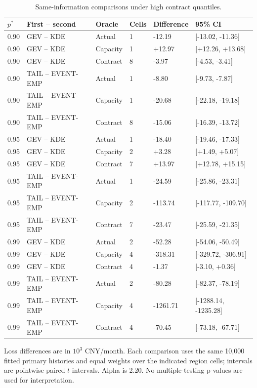 \begingroup
\fontsize{8.5}{10.5}\selectfont\setlength{\tabcolsep}{3.0pt}\renewcommand{\arraystretch}{1.23}
\begin{table}[tbp]\centering
\caption{Same-information comparisons under high contract quantiles.}\label{tab:si-high-pstar}
\begin{tabular}{@{}llllll@{}}\toprule
$p^*$ & First -- second & Oracle & Cells & Difference & 95\% CI\\\midrule
0.90 & GEV -- KDE & Actual & 1 & -12.19 & [-13.02, -11.36]\\
0.90 & GEV -- KDE & Capacity & 1 & +12.97 & [+12.26, +13.68]\\
0.90 & GEV -- KDE & Contract & 8 & -3.97 & [-4.53, -3.41]\\
0.90 & TAIL -- EVENT-EMP & Actual & 1 & -8.80 & [-9.73, -7.87]\\
0.90 & TAIL -- EVENT-EMP & Capacity & 1 & -20.68 & [-22.18, -19.18]\\
0.90 & TAIL -- EVENT-EMP & Contract & 8 & -15.06 & [-16.39, -13.72]\\
0.95 & GEV -- KDE & Actual & 1 & -18.40 & [-19.46, -17.33]\\
0.95 & GEV -- KDE & Capacity & 2 & +3.28 & [+1.49, +5.07]\\
0.95 & GEV -- KDE & Contract & 7 & +13.97 & [+12.78, +15.15]\\
0.95 & TAIL -- EVENT-EMP & Actual & 1 & -24.59 & [-25.86, -23.31]\\
0.95 & TAIL -- EVENT-EMP & Capacity & 2 & -113.74 & [-117.77, -109.70]\\
0.95 & TAIL -- EVENT-EMP & Contract & 7 & -23.47 & [-25.59, -21.35]\\
0.99 & GEV -- KDE & Actual & 2 & -52.28 & [-54.06, -50.49]\\
0.99 & GEV -- KDE & Capacity & 4 & -318.31 & [-329.72, -306.91]\\
0.99 & GEV -- KDE & Contract & 4 & -1.37 & [-3.10, +0.36]\\
0.99 & TAIL -- EVENT-EMP & Actual & 2 & -80.28 & [-82.37, -78.19]\\
0.99 & TAIL -- EVENT-EMP & Capacity & 4 & -1261.71 & [-1288.14, -1235.28]\\
0.99 & TAIL -- EVENT-EMP & Contract & 4 & -70.45 & [-73.18, -67.71]\\
\bottomrule
\end{tabular}
\par\smallskip\noindent\begin{minipage}{\linewidth}\footnotesize Loss differences are in $10^3$ CNY/month. Each comparison uses the same 10,000 fitted primary histories and equal weights over the indicated region cells; intervals are pointwise paired $t$ intervals. Alpha is 2.20. No multiple-testing p-values are used for interpretation.\end{minipage}
\end{table}
\endgroup

